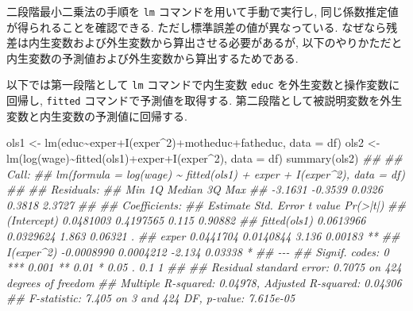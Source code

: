 \documentclass[
  letterpaper,
  xelatex,
  ja=standard, xelatex]{bxjsbook}
\newenvironment{Shaded}{\begin{snugshade}}{\end{snugshade}}
\newcommand{\AttributeTok}[1]{\textcolor[rgb]{0.40,0.45,0.13}{#1}}
\newcommand{\DecValTok}[1]{\textcolor[rgb]{0.68,0.00,0.00}{#1}}
\newcommand{\DocumentationTok}[1]{\textcolor[rgb]{0.37,0.37,0.37}{\textit{#1}}}
\newcommand{\FunctionTok}[1]{\textcolor[rgb]{0.28,0.35,0.67}{#1}}
\newcommand{\NormalTok}[1]{\textcolor[rgb]{0.00,0.23,0.31}{#1}}
\newcommand{\OtherTok}[1]{\textcolor[rgb]{0.00,0.23,0.31}{#1}}
\newcommand{\SpecialCharTok}[1]{\textcolor[rgb]{0.37,0.37,0.37}{#1}}
\begin{document}
二段階最小二乗法の手順を \texttt{lm} コマンドを用いて手動で実行し,
同じ係数推定値が得られることを確認できる.
ただし標準誤差の値が異なっている.
なぜなら残差は内生変数および外生変数から算出させる必要があるが,
以下のやりかただと内生変数の予測値および外生変数から算出するためである.

以下では第一段階として \texttt{lm} コマンドで内生変数 \texttt{educ}
を外生変数と操作変数に回帰し, \texttt{fitted}
コマンドで予測値を取得する.
第二段階として被説明変数を外生変数と内生変数の予測値に回帰する.

\begin{Shaded}
\begin{Highlighting}[]
\NormalTok{ols1 }\OtherTok{\textless{}{-}} \FunctionTok{lm}\NormalTok{(educ}\SpecialCharTok{\textasciitilde{}}\NormalTok{exper}\SpecialCharTok{+}\FunctionTok{I}\NormalTok{(exper}\SpecialCharTok{\^{}}\DecValTok{2}\NormalTok{)}\SpecialCharTok{+}\NormalTok{motheduc}\SpecialCharTok{+}\NormalTok{fatheduc,  }\AttributeTok{data =}\NormalTok{ df)}
\NormalTok{ols2 }\OtherTok{\textless{}{-}} \FunctionTok{lm}\NormalTok{(}\FunctionTok{log}\NormalTok{(wage)}\SpecialCharTok{\textasciitilde{}}\FunctionTok{fitted}\NormalTok{(ols1)}\SpecialCharTok{+}\NormalTok{exper}\SpecialCharTok{+}\FunctionTok{I}\NormalTok{(exper}\SpecialCharTok{\^{}}\DecValTok{2}\NormalTok{),  }\AttributeTok{data =}\NormalTok{ df)}
\FunctionTok{summary}\NormalTok{(ols2)}
\DocumentationTok{\#\# }
\DocumentationTok{\#\# Call:}
\DocumentationTok{\#\# lm(formula = log(wage) \textasciitilde{} fitted(ols1) + exper + I(exper\^{}2), data = df)}
\DocumentationTok{\#\# }
\DocumentationTok{\#\# Residuals:}
\DocumentationTok{\#\#     Min      1Q  Median      3Q     Max }
\DocumentationTok{\#\# {-}3.1631 {-}0.3539  0.0326  0.3818  2.3727 }
\DocumentationTok{\#\# }
\DocumentationTok{\#\# Coefficients:}
\DocumentationTok{\#\#                Estimate Std. Error t value Pr(\textgreater{}|t|)   }
\DocumentationTok{\#\# (Intercept)   0.0481003  0.4197565   0.115  0.90882   }
\DocumentationTok{\#\# fitted(ols1)  0.0613966  0.0329624   1.863  0.06321 . }
\DocumentationTok{\#\# exper         0.0441704  0.0140844   3.136  0.00183 **}
\DocumentationTok{\#\# I(exper\^{}2)   {-}0.0008990  0.0004212  {-}2.134  0.03338 * }
\DocumentationTok{\#\# {-}{-}{-}}
\DocumentationTok{\#\# Signif. codes:  0 \textquotesingle{}***\textquotesingle{} 0.001 \textquotesingle{}**\textquotesingle{} 0.01 \textquotesingle{}*\textquotesingle{} 0.05 \textquotesingle{}.\textquotesingle{} 0.1 \textquotesingle{} \textquotesingle{} 1}
\DocumentationTok{\#\# }
\DocumentationTok{\#\# Residual standard error: 0.7075 on 424 degrees of freedom}
\DocumentationTok{\#\# Multiple R{-}squared:  0.04978,    Adjusted R{-}squared:  0.04306 }
\DocumentationTok{\#\# F{-}statistic: 7.405 on 3 and 424 DF,  p{-}value: 7.615e{-}05}
\end{Highlighting}
\end{Shaded}
\end{document}
